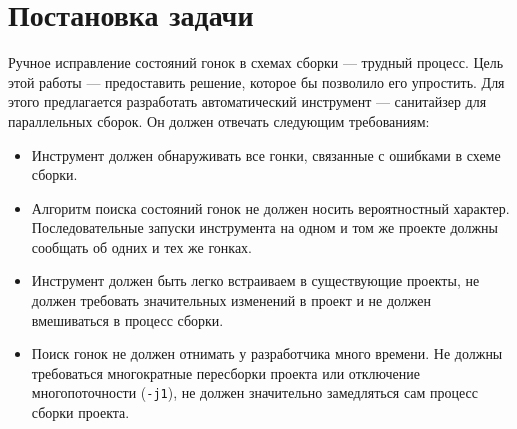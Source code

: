\section{Постановка задачи}
\label{sec:Chapter1} 


Ручное исправление состояний гонок в схемах сборки --- трудный процесс. Цель этой работы --- предоставить решение, которое бы позволило его упростить. Для этого предлагается разработать автоматический инструмент --- санитайзер для параллельных сборок. Он должен отвечать следующим требованиям:

\begin{itemize}
	\item Инструмент должен обнаруживать все гонки, связанные с ошибками в схеме сборки.
	\item Алгоритм поиска состояний гонок не должен носить вероятностный характер. Последовательные запуски инструмента на одном и том же проекте должны сообщать об одних и тех же гонках. 
	\item Инструмент должен быть легко встраиваем в существующие проекты, не должен требовать значительных изменений в проект и не должен вмешиваться в процесс сборки. 
	\item Поиск гонок не должен отнимать у разработчика много времени. Не должны требоваться многократные пересборки проекта или отключение многопоточности (\texttt{-j1}), не должен значительно замедляться сам процесс сборки проекта.
\end{itemize}

